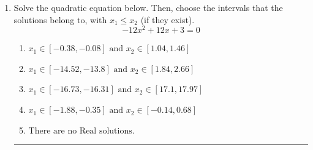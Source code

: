 \documentclass[14pt]{extbook}
\newcommand{\litem}[1]{\item#1\hspace*{-1cm}\rule{\textwidth}{0.4pt}}
\begin{document}
\begin{enumerate}
{\begin{enumerate}[label=\Alph*.]
\end{enumerate} }
\litem{
Solve the quadratic equation below. Then, choose the intervals that the solutions belong to, with $x_1 \leq x_2$ (if they exist).\[ -12x^{2} +12 x + 3 = 0 \]\begin{enumerate}[label=\Alph*.]
\item \( x_1 \in [-0.38, -0.08] \text{ and } x_2 \in [1.04, 1.46] \)
\item \( x_1 \in [-14.52, -13.8] \text{ and } x_2 \in [1.84, 2.66] \)
\item \( x_1 \in [-16.73, -16.31] \text{ and } x_2 \in [17.1, 17.97] \)
\item \( x_1 \in [-1.88, -0.35] \text{ and } x_2 \in [-0.14, 0.68] \)
\item \( \text{There are no Real solutions.} \)


\end{enumerate}}
\end{enumerate}
\end{document}

